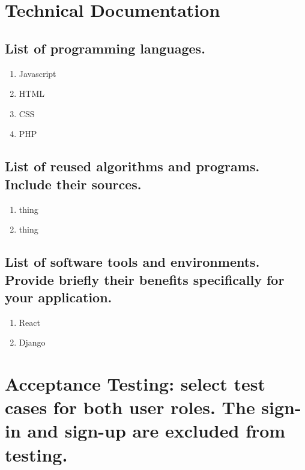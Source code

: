 \documentclass[letterpaper, 12 pt, conference]{ieeeconf}
\begin{document}

\section{Technical Documentation}
\subsection{List of programming languages.}
\begin{enumerate}
   \item Javascript
   \item HTML
   \item CSS
   \item PHP
\end{enumerate}

\subsection{List of reused algorithms and programs. Include their sources.}
\begin{enumerate}
   \item thing
   \item thing
\end{enumerate}

\subsection{List of software tools and environments. Provide briefly their benefits specifically for your application.}
\begin{enumerate}
   \item React
   \item Django
\end{enumerate}


\section{Acceptance Testing: select test cases for both user roles. The sign-in and sign-up are excluded from testing.}
\end{document}
